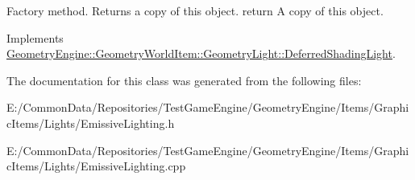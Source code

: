 Factory method. Returns a copy of this object. return A copy of this object. 

Implements \mbox{\hyperlink{class_geometry_engine_1_1_geometry_world_item_1_1_geometry_light_1_1_deferred_shading_light_a7ef4d7b7a41cbda01a55bcb0475484d3}{Geometry\+Engine\+::\+Geometry\+World\+Item\+::\+Geometry\+Light\+::\+Deferred\+Shading\+Light}}.



The documentation for this class was generated from the following files\+:\begin{DoxyCompactItemize}
\item 
E\+:/\+Common\+Data/\+Repositories/\+Test\+Game\+Engine/\+Geometry\+Engine/\+Items/\+Graphic\+Items/\+Lights/Emissive\+Lighting.\+h\item 
E\+:/\+Common\+Data/\+Repositories/\+Test\+Game\+Engine/\+Geometry\+Engine/\+Items/\+Graphic\+Items/\+Lights/Emissive\+Lighting.\+cpp\end{DoxyCompactItemize}
